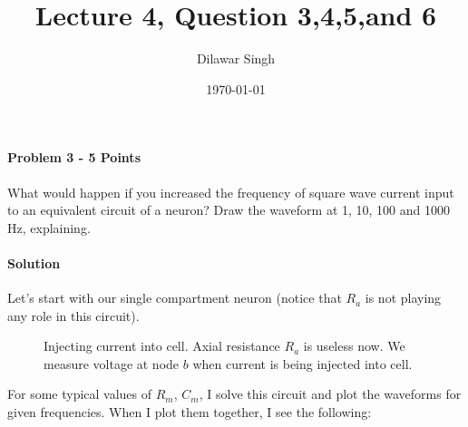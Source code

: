 \documentclass[a4paper,10pt]{article}
\title{Lecture 4, Question 3,4,5,and 6}
\author{Dilawar Singh}
\date{\today}
\begin{document}
\maketitle

\paragraph{Problem 3 - 5 Points}
\label{par:Problem 4}
What would happen if you increased the frequency of square wave current input to 
an equivalent circuit of a neuron? Draw the waveform at 1, 10, 100 and 1000 Hz, 
explaining.

\paragraph{Solution} Let's start with our single compartment neuron (notice that
$R_a$ is not playing any role in this circuit).

\begin{figure}[h]
    \centering
    \caption{Injecting current into cell. Axial resistance $R_a$ is useless now.
    We measure voltage at node $b$ when current is being injected into cell.}
    \label{fig:sphere}
\end{figure}

For some typical values of $R_m$, $C_m$, I solve this circuit and plot the
waveforms for given frequencies. When I plot them together, I see the following:
\end{document}
